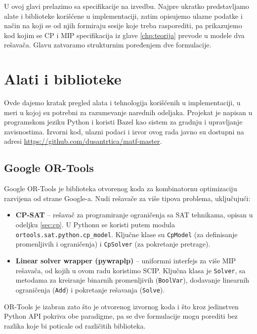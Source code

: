 \documentclass[12pt,oneside]{memoir}
\begin{document}
U ovoj glavi prelazimo sa specifikacije na izvedbu. Najpre ukratko
predstavljamo alate i biblioteke korišćene u implementaciji, zatim
opisujemo ulazne podatke i način na koji se od njih formiraju sesije
koje treba rasporediti, pa prikazujemo kod kojim se CP i MIP
specifikacija iz glave \ref{chp:teorija} prevode u modele dva
rešavača. Glavu zatvaramo strukturnim poređenjem dve formulacije.

\section{Alati i biblioteke}
\label{sec:alati}

Ovde dajemo kratak pregled alata i tehnologija korišćenih u
implementaciji, u meri u kojoj su potrebni za razumevanje narednih
odeljaka. Projekat je napisan u programskom jeziku Python \cite{python} i
koristi Bazel \cite{bazel} kao sistem za gradnju i upravljanje
zavisnostima. Izvorni kod, ulazni podaci i izvor ovog rada javno su
dostupni na adresi \url{https://github.com/dusantrtica/matf-master}.

\subsection{Google OR-Tools}
\label{sec:ortools}

Google OR-Tools \cite{ortools} je biblioteka otvorenog koda za
kombinatornu optimizaciju razvijena od strane Google-a. Nudi rešavače
za više tipova problema, uključujući:

\begin{itemize}
\item \textbf{CP-SAT} -- rešavač za programiranje ograničenja sa
  SAT tehnikama, opisan u odeljku \ref{sec:cp}. U Pythonu se koristi
  putem modula \texttt{ortools.sat.python.cp\_model}. Ključne klase
  su \texttt{CpModel} (za definisanje promenljivih i ograničenja)
  i \texttt{CpSolver} (za pokretanje pretrage).

\item \textbf{Linear solver wrapper (pywraplp)} -- uniformni interfejs
  za više MIP rešavača, od kojih u ovom radu koristimo SCIP. Ključna
  klasa je \texttt{Solver}, sa metodama za kreiranje binarnih
  promenljivih (\texttt{BoolVar}), dodavanje linearnih ograničenja
  (\texttt{Add}) i pokretanje rešavanja (\texttt{Solve}).
\end{itemize}

OR-Tools je izabran zato što je otvorenog izvornog koda i što kroz
jedinstven Python API pokriva obe paradigme, pa se dve formulacije
mogu porediti bez razlika koje bi poticale od različitih biblioteka.
\end{document}
